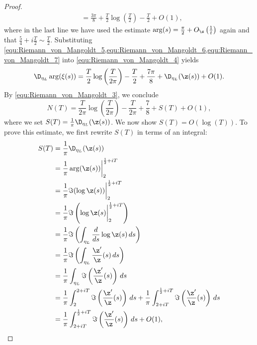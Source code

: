 \begin{proof}
\begin{equation}
\begin{aligned}
            &= \frac{3\pi}{8}+\frac{T}{2}\log\left(\frac{T}{2}\right)-\frac{T}{2}+O(1),
          \end{aligned}
        \end{equation}
        where in the last line we have used the estimate $\arg(s) = \frac{\pi}{2}+O_{\s}\left(\frac{1}{t}\right)$ again and that $\frac{5}{4}+i\frac{T}{2} \sim \frac{T}{2}$. Substituting \cref{equ:Riemann_von_Mangoldt_5,equ:Riemann_von_Mangoldt_6,equ:Riemann_von_Mangoldt_7} into \cref{equ:Riemann_von_Mangoldt_4} yields
        \[
          \D_{\eta_{L}}\arg(\xi(s)) = \frac{T}{2}\log\left(\frac{T}{2\pi}\right)-\frac{T}{2}+\frac{7\pi}{8}+\D_{\eta_{L}}(\z(s))+O(1).
        \]
        By \cref{equ:Riemann_von_Mangoldt_3}, we conclude
        \begin{equation}\label{equ:Riemann_von_Mangoldt_8}
          N(T) = \frac{T}{2\pi}\log\left(\frac{T}{2\pi}\right)-\frac{T}{2\pi}+\frac{7}{8}+S(T)+O(1),
        \end{equation}
        where we set $S(T) = \frac{1}{\pi}\D_{\eta_{L}}(\z(s))$. We now show $S(T) = O(\log(T))$. To prove this estimate, we first rewrite $S(T)$ in terms of an integral:
        \begin{equation}\label{equ:Riemann_von_Mangoldt_9}
          \begin{aligned}
            S(T) &= \frac{1}{\pi}\D_{\eta_{L}}(\z(s)) \\
            &= \frac{1}{\pi}\arg(\z(s))\bigg|_{2}^{\frac{1}{2}+iT} \\
            &= \frac{1}{\pi}\Im(\log\z(s))\bigg|_{2}^{\frac{1}{2}+iT} \\
            &= \frac{1}{\pi}\Im\left(\log\z(s)\bigg|_{2}^{\frac{1}{2}+iT}\right) \\
            &= \frac{1}{\pi}\Im\left(\int_{\eta_{L}}\frac{d}{ds}\log\z(s)\,ds\right) \\
            &= \frac{1}{\pi}\Im\left(\int_{\eta_{L}}\frac{\z'}{\z}(s)\,ds\right) \\
            &= \frac{1}{\pi}\int_{\eta_{L}}\Im\left(\frac{\z'}{\z}(s)\right)\,ds \\
            &= \frac{1}{\pi}\int_{2}^{2+iT}\Im\left(\frac{\z'}{\z}(s)\right)\,ds+\frac{1}{\pi}\int_{2+iT}^{\frac{1}{2}+iT}\Im\left(\frac{\z'}{\z}(s)\right)\,ds \\
            &= \frac{1}{\pi}\int_{2+iT}^{\frac{1}{2}+iT}\Im\left(\frac{\z'}{\z}(s)\right)\,ds+O(1),
          \end{aligned}
        \end{equation}

\end{proof}
